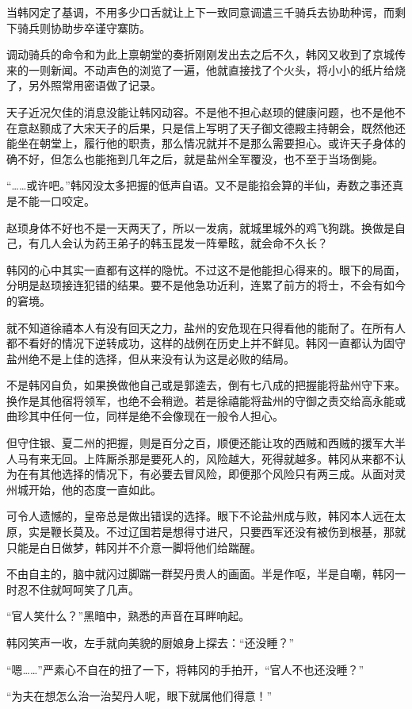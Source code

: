 当韩冈定了基调，不用多少口舌就让上下一致同意调遣三千骑兵去协助种谔，而剩下骑兵则协助步卒谨守寨防。

调动骑兵的命令和为此上禀朝堂的奏折刚刚发出去之后不久，韩冈又收到了京城传来的一则新闻。不动声色的浏览了一遍，他就直接找了个火头，将小小的纸片给烧了，另外照常用密语做了记录。

天子近况欠佳的消息没能让韩冈动容。不是他不担心赵顼的健康问题，也不是他不在意赵颢成了大宋天子的后果，只是信上写明了天子御文德殿主持朝会，既然他还能坐在朝堂上，履行他的职责，那么情况就并不是那么需要担心。或许天子身体的确不好，但怎么也能拖到几年之后，就是盐州全军覆没，也不至于当场倒毙。

“……或许吧。”韩冈没太多把握的低声自语。又不是能掐会算的半仙，寿数之事还真是不能一口咬定。

赵顼身体不好也不是一天两天了，所以一发病，就城里城外的鸡飞狗跳。换做是自己，有几人会认为药王弟子的韩玉昆发一阵晕眩，就会命不久长？

韩冈的心中其实一直都有这样的隐忧。不过这不是他能担心得来的。眼下的局面，分明是赵顼接连犯错的结果。要不是他急功近利，连累了前方的将士，不会有如今的窘境。

就不知道徐禧本人有没有回天之力，盐州的安危现在只得看他的能耐了。在所有人都不看好的情况下逆转成功，这样的战例在历史上并不鲜见。韩冈一直都认为固守盐州绝不是上佳的选择，但从来没有认为这是必败的结局。

不是韩冈自负，如果换做他自己或是郭逵去，倒有七八成的把握能将盐州守下来。换作是其他宿将领军，也绝不会稍逊。若是徐禧能将盐州的守御之责交给高永能或曲珍其中任何一位，同样是绝不会像现在一般令人担心。

但守住银、夏二州的把握，则是百分之百，顺便还能让攻的西贼和西贼的援军大半人马有来无回。上阵厮杀那是要死人的，风险越大，死得就越多。韩冈从来都不认为在有其他选择的情况下，有必要去冒风险，即便那个风险只有两三成。从面对灵州城开始，他的态度一直如此。

可令人遗憾的，皇帝总是做出错误的选择。眼下不论盐州成与败，韩冈本人远在太原，实是鞭长莫及。不过辽国若是想得寸进尺，只要西军还没有被伤到根基，那就只能是白日做梦，韩冈并不介意一脚将他们给踹醒。

不由自主的，脑中就闪过脚踹一群契丹贵人的画面。半是作呕，半是自嘲，韩冈一时忍不住就呵呵笑了几声。

“官人笑什么？”黑暗中，熟悉的声音在耳畔响起。

韩冈笑声一收，左手就向美貌的厨娘身上探去：“还没睡？”

“嗯……”严素心不自在的扭了一下，将韩冈的手拍开，“官人不也还没睡？”

“为夫在想怎么治一治契丹人呢，眼下就属他们得意！”

